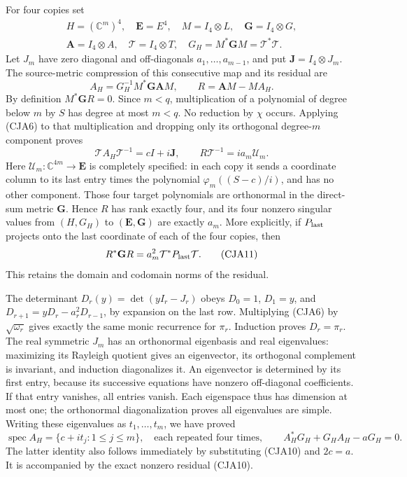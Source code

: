 For four copies set
\[
\begin{gathered}
 H=(\mathbb C^m)^4,\quad
 \mathbf E=E^4,\quad
 M=I_4\otimes L,\quad
 \mathbf G=I_4\otimes G,\\
 \mathbf A=I_4\otimes A,\quad
 \mathcal T=I_4\otimes T,\quad
 G_H=M^*\mathbf GM=\mathcal T^*\mathcal T.
\end{gathered}
\]
Let \(J_m\) have zero diagonal and off-diagonals
\(a_1,\ldots,a_{m-1}\), and put \(\mathbf J=I_4\otimes J_m\).
The source-metric compression of this consecutive map and its residual are
\begin{equation}
 A_H=G_H^{-1}M^*\mathbf G\mathbf AM,\qquad
 R=\mathbf AM-MA_H .
 \tag{CJA9}
\end{equation}
By definition \(M^*\mathbf GR=0\).
Since \(m<q\), multiplication of a polynomial of degree below \(m\)
by \(S\) has degree at most \(m<q\).  No reduction by \(\chi\)
occurs.  Applying (CJA6) to that multiplication and dropping only its
orthogonal degree-\(m\) component proves
\begin{equation}
 \boxed{\mathcal TA_H\mathcal T^{-1}=cI+i\mathbf J,\qquad
 R\mathcal T^{-1}=i a_m\mathcal U_m.}
 \tag{CJA10}
\end{equation}
Here \(\mathcal U_m:\mathbb C^{4m}\to\mathbf E\) is completely specified:
in each copy it sends a coordinate column to its last entry times the
polynomial \(\varphi_m((S-c)/i)\), and has no other component.
Those four target polynomials are orthonormal in the direct-sum
metric \(\mathbf G\).  Hence \(R\) has rank exactly four, and its four
nonzero singular values from \((H,G_H)\) to
\((\mathbf E,\mathbf G)\) are exactly \(a_m\).
More explicitly, if \(P_{\rm last}\) projects onto the last coordinate
of each of the four copies, then
\begin{equation}
 R^*\mathbf GR=a_m^2\mathcal T^*P_{\rm last}\mathcal T .
 \tag{CJA11}
\end{equation}
This retains the domain and codomain norms of the residual.

The determinant \(D_r(y)=\det(yI_r-J_r)\) obeys
\(D_0=1\), \(D_1=y\), and
\(D_{r+1}=yD_r-a_r^2D_{r-1}\), by expansion on the last row.
Multiplying (CJA6) by \(\sqrt{\omega_r}\) gives exactly the same
monic recurrence for \(\pi_r\).
Induction proves \(D_r=\pi_r\).
The real symmetric \(J_m\) has an orthonormal eigenbasis and real
eigenvalues: maximizing its Rayleigh quotient gives an eigenvector,
its orthogonal complement is invariant, and induction diagonalizes it.
An eigenvector is determined by its first entry, because its
successive equations have nonzero off-diagonal coefficients.
If that entry vanishes, all entries vanish.  Each eigenspace thus has
dimension at most one; the orthonormal diagonalization proves all
eigenvalues are simple.
Writing these eigenvalues as \(t_1,\ldots,t_m\), we have proved
\begin{equation}
 \operatorname{spec}A_H=\{c+it_j:1\leq j\leq m\},
 \quad\text{each repeated four times},\qquad
 A_H^*G_H+G_HA_H-aG_H=0.
 \tag{CJA12}
\end{equation}
The latter identity also follows immediately by substituting
(CJA10) and \(2c=a\).
It is accompanied by the exact nonzero residual (CJA10).

